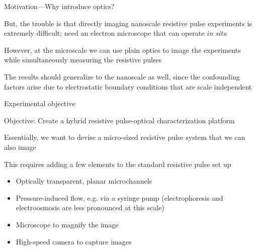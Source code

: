 

\begin{frame}[c]{Motivation---Why introduce optics?}
	
	But, the trouble is that directly imaging nanoscale resistive pulse experiments is extremely difficult; need an electron microscope that can operate \textit{in situ}
	
	\vspace{.2in}
	
	However, at the microscale we can use plain optics to image the experiments while simultaneously measuring the resistive pulses
	
	\vspace{.2in}
	
	The results should generalize to the nanoscale as well, since the confounding factors arise due to electrostatic boundary conditions that are scale independent
	
	\vspace{.2in}
	

\end{frame}




\begin{frame}[c]{Experimental objective}

	\textcolor{negativered}{Objective: Create a hybrid resistive pulse-optical characterization platform} \\
	
	\vspace{.1in}
	
	Essentially, we want to devise a micro-sized resistive pulse system that we can also image \\
	
	\vspace{.1in}
	
	This requires adding a few elements to the standard resistive pulse set up
	
	\begin{itemize}
		\item Optically transparent, planar microchannels
		\item Pressure-induced flow, e.g. via a syringe pump (electrophoresis and electroosmosis are less pronounced at this scale)
		\item Microscope to magnify the image
		\item High-speed camera to capture images
	\end{itemize}

	
	

\end{frame}


